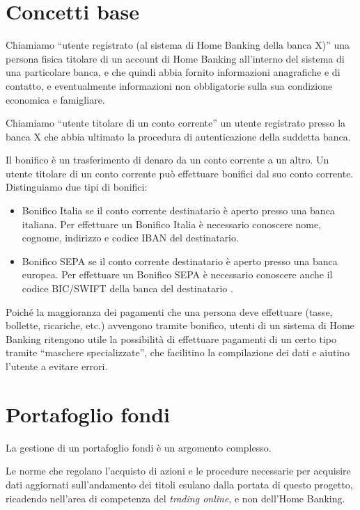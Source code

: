 \documentclass[10pt]{softeng} %
\begin{document}
\section{Concetti base}

Chiamiamo ``utente registrato (al sistema di Home Banking della banca X)'' una persona fisica titolare di un account di Home Banking all'interno del sistema di una particolare banca, e che quindi abbia fornito informazioni anagrafiche e di contatto, e eventualmente informazioni non obbligatorie sulla sua condizione economica e famigliare.

Chiamiamo ``utente titolare di un conto corrente'' un utente registrato presso la banca X che abbia ultimato la procedura di autenticazione della suddetta banca.

Il bonifico \`e un trasferimento di denaro da un conto corrente a un altro.
Un utente titolare di un conto corrente pu\`o effettuare bonifici dal suo conto corrente.
Distinguiamo due tipi di bonifici:
\begin{itemize}
	\item Bonifico Italia se il conto corrente destinatario \`e aperto presso una banca italiana.
	Per effettuare un Bonifico Italia \`e necessario conoscere nome, cognome, indirizzo e codice IBAN del destinatario.
	\item Bonifico SEPA se il conto corrente destinatario \`e aperto presso una banca europea. Per effettuare un Bonifico SEPA \`e necessario conoscere anche il codice BIC/SWIFT della banca del destinatario \cite{bonifico_unicredit}.
\end{itemize}
Poich\'e la maggioranza dei pagamenti che una persona deve effettuare (tasse, bollette, ricariche, etc.) avvengono tramite bonifico, utenti di un sistema di Home Banking ritengono utile la possibilit\`a di effettuare pagamenti di un certo tipo tramite ``maschere specializzate'', che facilitino la compilazione dei dati e aiutino l'utente a evitare errori.



\section{Portafoglio fondi}

La gestione di un portafoglio fondi \`e un argomento complesso.

Le norme che regolano l'acquisto di azioni e le procedure necessarie per acquisire dati aggiornati sull'andamento dei titoli esulano dalla portata di questo progetto, ricadendo nell'area di competenza del \emph{trading online}, e non dell'Home Banking.
\end{document}
